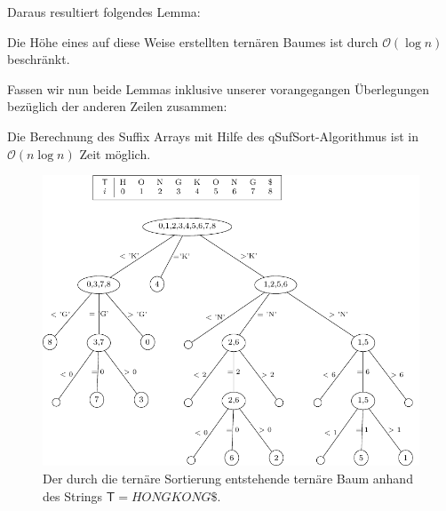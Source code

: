 Daraus resultiert folgendes Lemma:
\begin{lemma}
Die Höhe eines auf diese Weise erstellten ternären Baumes ist durch $\mathcal{O}(\log n)$ beschränkt.
\end{lemma}
Fassen wir nun beide Lemmas inklusive unserer vorangegangen Überlegungen bezüglich der anderen Zeilen zusammen: 
\begin{lemma}
Die Berechnung des Suffix Arrays mit Hilfe des qSufSort-Algorithmus ist in $\mathcal{O}(n\log n)$ Zeit möglich.
\end{lemma}
\begin{figure}[t]
\centering
\includegraphics[scale=0.9]{kapitel/saca_algorithmen/qsufsort/Bilder/TerTree.pdf}
\caption{Der durch die ternäre Sortierung entstehende ternäre Baum anhand des Strings $\mathsf{T}=HONGKONG\$$.}
\label{terTree}
\end{figure}